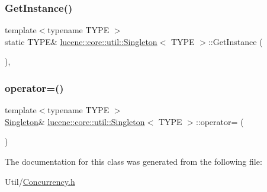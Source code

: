 \subsubsection{\texorpdfstring{Get\+Instance()}{GetInstance()}}
{\footnotesize\ttfamily template$<$typename T\+Y\+PE $>$ \\
static T\+Y\+PE\& \mbox{\hyperlink{classlucene_1_1core_1_1util_1_1Singleton}{lucene\+::core\+::util\+::\+Singleton}}$<$ T\+Y\+PE $>$\+::Get\+Instance (\begin{DoxyParamCaption}{ }\end{DoxyParamCaption})\hspace{0.3cm}{\ttfamily [inline]}, {\ttfamily [static]}}

\mbox{\label{classlucene_1_1core_1_1util_1_1Singleton_abec7d88a0f754dfa66438cc76e4c5fd5}} 
\subsubsection{\texorpdfstring{operator=()}{operator=()}}
{\footnotesize\ttfamily template$<$typename T\+Y\+PE $>$ \\
\mbox{\hyperlink{classlucene_1_1core_1_1util_1_1Singleton}{Singleton}}\& \mbox{\hyperlink{classlucene_1_1core_1_1util_1_1Singleton}{lucene\+::core\+::util\+::\+Singleton}}$<$ T\+Y\+PE $>$\+::operator= (\begin{DoxyParamCaption}\item[{const \mbox{\hyperlink{classlucene_1_1core_1_1util_1_1Singleton}{Singleton}}$<$ T\+Y\+PE $>$ \&}]{ }\end{DoxyParamCaption})\hspace{0.3cm}{\ttfamily [delete]}}



The documentation for this class was generated from the following file\+:\begin{DoxyCompactItemize}
\item 
Util/\mbox{\hyperlink{Concurrency_8h}{Concurrency.\+h}}\end{DoxyCompactItemize}
